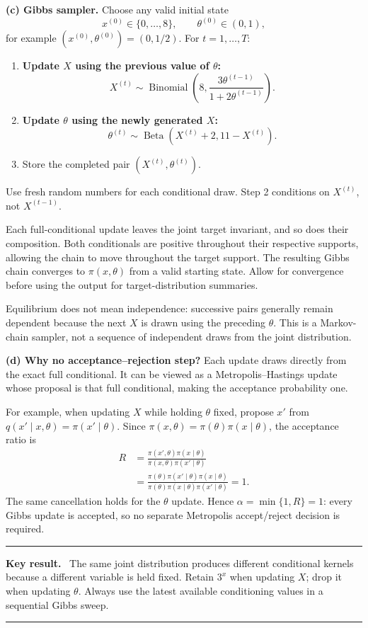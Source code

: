 \documentclass[11pt,a4paper]{article}
\newcommand{\given}{\mathrel{|}}
\newenvironment{keyresult}
  {\begin{center}\begin{minipage}{0.92\linewidth}\color{statblue}%
   \hrule\vspace{6pt}\textbf{Key result.}\ }
  {\vspace{6pt}\hrule\end{minipage}\end{center}}
\begin{document}
\textbf{(c) Gibbs sampler.}
Choose any valid initial state
\[
x^{(0)}\in\{0,\ldots,8\},\qquad\theta^{(0)}\in(0,1),
\]
for example $(x^{(0)},\theta^{(0)})=(0,1/2)$.
For $t=1,\ldots,T$:
\begin{enumerate}[label=\arabic*.]
  \item \textbf{Update $X$ using the previous value of $\theta$:}
        \[
        X^{(t)}\sim\operatorname{Binomial}\!\left(
        8,\frac{3\theta^{(t-1)}}{1+2\theta^{(t-1)}}\right).
        \]
  \item \textbf{Update $\theta$ using the newly generated $X$:}
        \[
        \theta^{(t)}\sim
        \operatorname{Beta}\!\left(X^{(t)}+2,11-X^{(t)}\right).
        \]
  \item Store the completed pair $(X^{(t)},\theta^{(t)})$.
\end{enumerate}
Use fresh random numbers for each conditional draw. Step 2 conditions
on $X^{(t)}$, not $X^{(t-1)}$.

Each full-conditional update leaves the joint target invariant, and so
does their composition. Both conditionals are positive throughout their
respective supports, allowing the chain to move throughout the target
support. The resulting Gibbs chain converges to $\pi(x,\theta)$ from a
valid starting state. Allow for convergence before using the output for
target-distribution summaries.

Equilibrium does not mean independence: successive pairs generally
remain dependent because the next $X$ is drawn using the preceding
$\theta$. This is a Markov-chain sampler, not a sequence of independent
draws from the joint distribution.

\textbf{(d) Why no acceptance--rejection step?}
Each update draws directly from the exact full conditional. It can be
viewed as a Metropolis--Hastings update whose proposal is that full
conditional, making the acceptance probability one.

For example, when updating $X$ while holding $\theta$ fixed, propose
$x'$ from $q(x'\given x,\theta)=\pi(x'\given\theta)$. Since
$\pi(x,\theta)=\pi(\theta)\pi(x\given\theta)$, the acceptance ratio is
\[
\begin{aligned}
R
&=\frac{\pi(x',\theta)\pi(x\given\theta)}
        {\pi(x,\theta)\pi(x'\given\theta)}\\
&=\frac{\pi(\theta)\pi(x'\given\theta)\pi(x\given\theta)}
        {\pi(\theta)\pi(x\given\theta)\pi(x'\given\theta)}
=1.
\end{aligned}
\]
The same cancellation holds for the $\theta$ update. Hence
$\alpha=\min\{1,R\}=1$: every Gibbs update is accepted, so no separate
Metropolis accept/reject decision is required.

\begin{keyresult}
The same joint distribution produces different conditional kernels
because a different variable is held fixed. Retain $3^x$ when updating
$X$; drop it when updating $\theta$. Always use the latest available
conditioning values in a sequential Gibbs sweep.
\end{keyresult}

\clearpage
\end{document}
